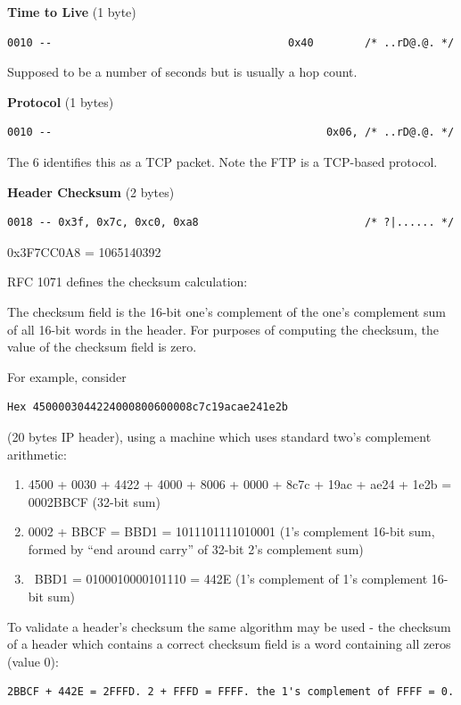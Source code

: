 \vspace{1mm}
\noindent
{\bf Time to Live} (1 byte)
\begin{verbatim}
0010 --                                     0x40        /* ..rD@.@. */
\end{verbatim}
Supposed to be a number of seconds but is usually a hop count.

\vspace{1mm}
\noindent
{\bf Protocol} (1 bytes) \cite{43}
\begin{verbatim}
0010 --                                           0x06, /* ..rD@.@. */
\end{verbatim}
The 6 identifies this as a TCP packet. Note the FTP is a TCP-based
protocol.

\vspace{1mm}
\noindent
{\bf Header Checksum} (2 bytes)
\begin{verbatim}
0018 -- 0x3f, 0x7c, 0xc0, 0xa8                          /* ?|...... */
\end{verbatim}
0x3F7CC0A8 = 1065140392

\vspace{1mm}
\noindent
RFC 1071 defines the checksum calculation:

The checksum field is the 16-bit one's complement of the one's
complement sum of all 16-bit words in the header. For purposes of
computing the checksum, the value of the checksum field is zero.

\vspace{1mm}
\noindent
For example, consider 
\begin{verbatim} 
Hex 4500003044224000800600008c7c19acae241e2b
\end{verbatim}
(20 bytes IP header), using a machine which uses standard two's 
complement arithmetic:
\begin{enumerate}
\item 4500 + 0030 + 4422 + 4000 + 8006 + 0000 + 8c7c + 19ac + ae24 + 1e2b =
 0002BBCF (32-bit sum)
\item 0002 + BBCF = BBD1 = 1011101111010001 (1's complement 16-bit sum, 
formed by ``end around carry'' of 32-bit 2's complement sum)
\item ~BBD1 = 0100010000101110 = 442E (1's complement of 1's complement 
16-bit sum)
\end{enumerate}
To validate a header's checksum the same algorithm may be used - the 
checksum of a header which contains a correct checksum field is a word 
containing all zeros (value 0):
\begin{verbatim}
2BBCF + 442E = 2FFFD. 2 + FFFD = FFFF. the 1's complement of FFFF = 0.
\end{verbatim}

